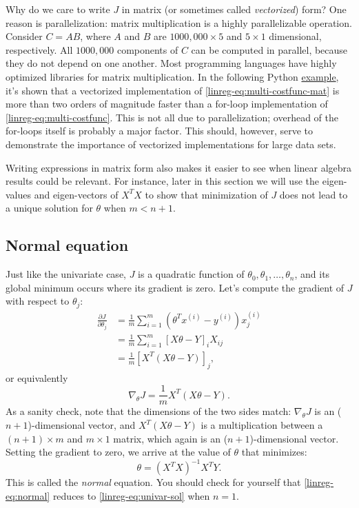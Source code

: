 \documentclass{article}
\theoremstyle{definition}
\begin{document}
Why do we care to write $J$ in matrix (or sometimes called \textit{vectorized}) form? One reason is parallelization: matrix multiplication is a highly parallelizable operation. Consider $C=AB$, where $A$ and $B$ are $1000,000 \times 5$ and $5 \times 1$ dimensional, respectively. All $1000,000$ components of $C$ can be computed in parallel, because they do not depend on one another. Most programming languages have highly optimized libraries for matrix multiplication. In the following Python \href{https://github.com/siavashaslanbeigi/machine_learning/blob/master/lin_reg/matrix.ipynb}{\color{blue} example}, it's shown that a vectorized implementation of \eqref{linreg-eq:multi-costfunc-mat} is more than two orders of magnitude faster than a for-loop implementation of \eqref{linreg-eq:multi-costfunc}. This is not all due to parallelization; overhead of the for-loops itself is probably a major factor. This should, however, serve to demonstrate the importance of vectorized implementations for large data sets.

Writing expressions in matrix form also makes it easier to see when linear algebra results could be relevant. For instance, later in this section we will use the eigen-values and eigen-vectors of $X^TX$ to show that minimization of $J$ does not lead to a unique solution for $\theta$ when $m<n+1$.


\subsection{Normal equation}
Just like the univariate case, $J$ is a quadratic function of $\theta_0, \theta_1, \dots, \theta_n$, and its global minimum occurs where its gradient is zero. Let's compute the gradient of $J$ with respect to $\theta_j$:
\begin{align*}
    \frac{\partial J}{\partial \theta_j} &= \frac{1}{m}\sum_{i=1}^{m}(\theta^Tx^{(i)} - y^{(i)})x^{(i)}_j\\
    &=\frac{1}{m}\sum_{i=1}^{m}[X\theta - Y]_iX_{ij}\\
    &=\frac{1}{m}[X^T(X\theta - Y)]_j,
\end{align*}
or equivalently
\begin{equation}
    \nabla_{\theta} J = \frac{1}{m}X^T(X\theta - Y).
\end{equation}
As a sanity check, note that the dimensions of the two sides match: $\nabla_{\theta} J$ is an ($n+1$)-dimensional vector, and $X^T(X\theta - Y)$ is a multiplication between a $(n+1) \times m$ and $m \times 1$ matrix, which again is an ($n+1$)-dimensional vector. Setting the gradient to zero, we arrive at the value of $\theta$ that minimizes:
\begin{equation}
    \theta = \left(X^TX\right)^{-1}X^TY.
    \label{linreg-eq:normal}
\end{equation}
This is called the \textit{normal} equation. You should check for yourself that \eqref{linreg-eq:normal} reduces to \eqref{linreg-eq:univar-sol} when $n = 1$.
\end{document}
